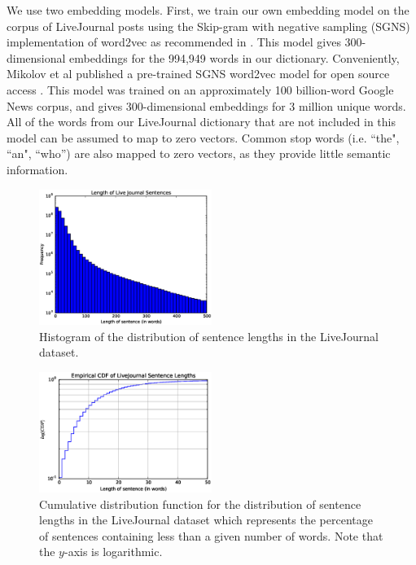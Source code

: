 \documentclass{sigchi}
\begin{document}
We use two embedding models. First, we train our own embedding model on the corpus of LiveJournal posts using the Skip-gram with negative sampling (SGNS) implementation of word2vec as recommended in \cite{MikolovSCCD13}. This model gives 300-dimensional embeddings for the 994,949 words in our dictionary. Conveniently, Mikolov et al published a pre-trained SGNS word2vec model for open source access \cite{word2vecWEB}. This model was trained on an approximately 100 billion-word Google News corpus, and gives 300-dimensional embeddings for 3 million unique words. All of the words from our LiveJournal dictionary that are not included in this model can be assumed to map to zero vectors. Common stop words (i.e. ``the", ``an", ``who'') are also mapped to zero vectors, as they provide little semantic information.  

\begin{figure}[tb]
\centering \includegraphics[width=0.5\textwidth]{figures/LJCounts} 
\caption{Histogram of the distribution of sentence lengths in the LiveJournal dataset. \label{fig:wordCounts}}
\end{figure}

\begin{figure}[tb]
\centering \includegraphics[width=0.5\textwidth]{figures/wordCDF} 
\caption{Cumulative distribution function for the distribution of sentence lengths in the LiveJournal dataset which represents the percentage of sentences containing less than a given number of words. Note that the $y$-axis is logarithmic. \label{fig:wordCDF}}
\end{figure}
\end{document}

